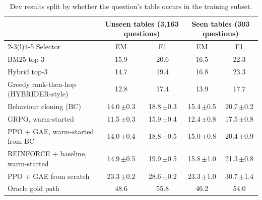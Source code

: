 \begin{table}[t]
\centering
\footnotesize
\caption{Dev results split by whether the question's table occurs in the training subset.}
\label{tab:unseen}
\begin{tabular}{@{}lcccc@{}}
\toprule
 & \multicolumn{2}{c}{Unseen tables (3,163 questions)} & \multicolumn{2}{c}{Seen tables (303 questions)} \\
\cmidrule(lr){2-3}\cmidrule(l){4-5}
Selector & EM & F1 & EM & F1 \\
\midrule
BM25 top-3 & 15.9 & 20.6 & 16.5 & 22.3 \\
Hybrid top-3 & 14.7 & 19.4 & 16.8 & 23.3 \\
Greedy rank-then-hop (HYBRIDER-style) & 12.8 & 17.4 & 13.9 & 17.7 \\
Behaviour cloning (BC) & 14.0\,{\scriptsize$\pm$0.3} & 18.8\,{\scriptsize$\pm$0.3} & 15.4\,{\scriptsize$\pm$0.5} & 20.7\,{\scriptsize$\pm$0.2} \\
GRPO, warm-started & 11.5\,{\scriptsize$\pm$0.3} & 15.9\,{\scriptsize$\pm$0.4} & 12.4\,{\scriptsize$\pm$0.8} & 17.5\,{\scriptsize$\pm$0.8} \\
PPO + GAE, warm-started from BC & 14.0\,{\scriptsize$\pm$0.4} & 18.8\,{\scriptsize$\pm$0.5} & 15.0\,{\scriptsize$\pm$0.8} & 20.4\,{\scriptsize$\pm$0.9} \\
REINFORCE + baseline, warm-started & 14.9\,{\scriptsize$\pm$0.5} & 19.9\,{\scriptsize$\pm$0.5} & 15.8\,{\scriptsize$\pm$1.0} & 21.3\,{\scriptsize$\pm$0.8} \\
PPO + GAE from scratch & 23.3\,{\scriptsize$\pm$0.2} & 28.6\,{\scriptsize$\pm$0.2} & 23.3\,{\scriptsize$\pm$1.0} & 30.7\,{\scriptsize$\pm$1.4} \\
Oracle gold path & 48.6 & 55.8 & 46.2 & 54.0 \\
\bottomrule
\end{tabular}
\end{table}
